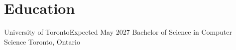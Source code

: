 
\section{Education}
\resumeSubHeadingListStart

\resumeSubheading
{University of Toronto}{Expected May 2027} {Bachelor of Science in Computer Science }{Toronto, Ontario}
\resumeItemListStart
\resumeItemListEnd

\resumeSubHeadingListEnd
    

    


